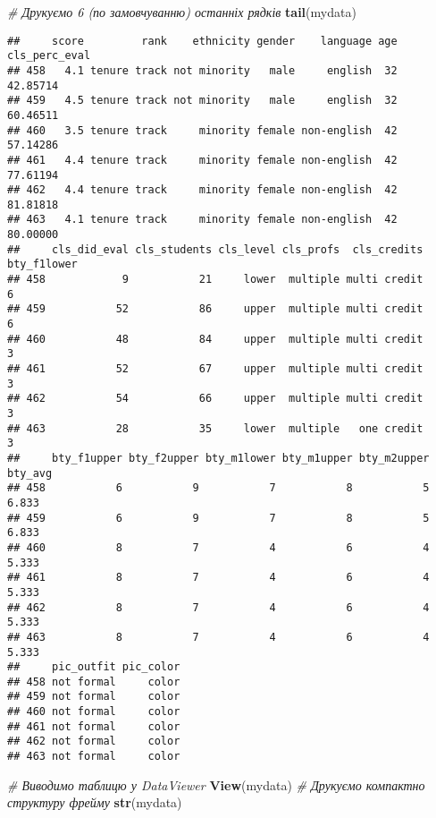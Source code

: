 \documentclass[
]{article}
\newenvironment{Shaded}{\begin{snugshade}}{\end{snugshade}}
\newcommand{\CommentTok}[1]{\textcolor[rgb]{0.56,0.35,0.01}{\textit{#1}}}
\newcommand{\KeywordTok}[1]{\textcolor[rgb]{0.13,0.29,0.53}{\textbf{#1}}}
\newcommand{\NormalTok}[1]{#1}
\begin{document}
\begin{Shaded}
\begin{Highlighting}[]
\CommentTok{# Друкуємо 6 (по замовчуванню) останніх рядків}
\KeywordTok{tail}\NormalTok{(mydata)}
\end{Highlighting}
\end{Shaded}

\begin{verbatim}
##     score         rank    ethnicity gender    language age cls_perc_eval
## 458   4.1 tenure track not minority   male     english  32      42.85714
## 459   4.5 tenure track not minority   male     english  32      60.46511
## 460   3.5 tenure track     minority female non-english  42      57.14286
## 461   4.4 tenure track     minority female non-english  42      77.61194
## 462   4.4 tenure track     minority female non-english  42      81.81818
## 463   4.1 tenure track     minority female non-english  42      80.00000
##     cls_did_eval cls_students cls_level cls_profs  cls_credits bty_f1lower
## 458            9           21     lower  multiple multi credit           6
## 459           52           86     upper  multiple multi credit           6
## 460           48           84     upper  multiple multi credit           3
## 461           52           67     upper  multiple multi credit           3
## 462           54           66     upper  multiple multi credit           3
## 463           28           35     lower  multiple   one credit           3
##     bty_f1upper bty_f2upper bty_m1lower bty_m1upper bty_m2upper bty_avg
## 458           6           9           7           8           5   6.833
## 459           6           9           7           8           5   6.833
## 460           8           7           4           6           4   5.333
## 461           8           7           4           6           4   5.333
## 462           8           7           4           6           4   5.333
## 463           8           7           4           6           4   5.333
##     pic_outfit pic_color
## 458 not formal     color
## 459 not formal     color
## 460 not formal     color
## 461 not formal     color
## 462 not formal     color
## 463 not formal     color
\end{verbatim}

\begin{Shaded}
\begin{Highlighting}[]
\CommentTok{# Виводимо таблицю у DataViewer}
\KeywordTok{View}\NormalTok{(mydata)}
\CommentTok{# Друкуємо компактно структуру фрейму}
\KeywordTok{str}\NormalTok{(mydata)}
\end{Highlighting}
\end{Shaded}
\end{document}
